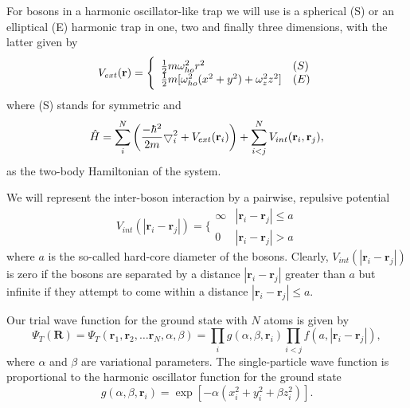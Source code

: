 For bosons in a harmonic oscillator-like  trap we will use is a spherical (S)
 or an elliptical (E) harmonic trap in one, two and finally three
 dimensions, with the latter given by
 \begin{equation}
 V_{ext}(\mathbf{r}) = \Bigg\{
 \begin{array}{ll}
	 \frac{1}{2}m\omega_{ho}^2r^2 & (S)\\
 \strut
	 \frac{1}{2}m[\omega_{ho}^2(x^2+y^2) + \omega_z^2z^2] & (E)
 \label{trap_eqn}
 \end{array}
 \end{equation}
where (S) stands for symmetric and 
\begin{equation}
     \hat{H} = \sum_i^N \left(
	 \frac{-\hbar^2}{2m}
	 { \bigtriangledown }_{i}^2 +
	 V_{ext}({\bf{r}}_i)\right)  +
	 \sum_{i<j}^{N} V_{int}({\bf{r}}_i,{\bf{r}}_j),
\end{equation}
as the two-body Hamiltonian of the system.  

 We will represent the inter-boson interaction by a pairwise, repulsive potential
\begin{equation}
 V_{int}(|\mathbf{r}_i-\mathbf{r}_j|) =  \Bigg\{
 \begin{array}{ll}
	 \infty & {|\mathbf{r}_i-\mathbf{r}_j|} \leq {a}\\
	 0 & {|\mathbf{r}_i-\mathbf{r}_j|} > {a}
 \end{array}
 \end{equation}
 where $a$ is the so-called hard-core diameter of the bosons.
 Clearly, $V_{int}(|\mathbf{r}_i-\mathbf{r}_j|)$ is zero if the bosons are
 separated by a distance $|\mathbf{r}_i-\mathbf{r}_j|$ greater than $a$ but
 infinite if they attempt to come within a distance $|\mathbf{r}_i-\mathbf{r}_j| \leq a$.

 Our trial wave function for the ground state with $N$ atoms is given by
 \begin{equation}
 \Psi_T(\mathbf{R})=\Psi_T(\mathbf{r}_1, \mathbf{r}_2, \dots \mathbf{r}_N,\alpha,\beta)=\prod_i g(\alpha,\beta,\mathbf{r}_i)\prod_{i<j}f(a,|\mathbf{r}_i-\mathbf{r}_j|),
 \label{eq:trialwf}
 \end{equation}
 where $\alpha$ and $\beta$ are variational parameters. The
 single-particle wave function is proportional to the harmonic
 oscillator function for the ground state
\begin{equation}
    g(\alpha,\beta,\mathbf{r}_i)= \exp{[-\alpha(x_i^2+y_i^2+\beta z_i^2)]}.
 \end{equation}

